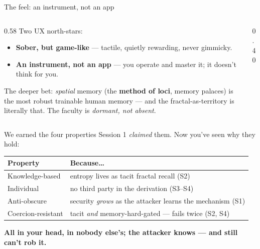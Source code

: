 \documentclass[aspectratio=169,11pt]{beamer}
\begin{document}
\begin{frame}{The feel: an instrument, not an app}
  \begin{columns}[T]
    \begin{column}{0.58\textwidth}
      Two UX north-stars:
      \begin{itemize}\small
        \item \textbf{Sober, but game-like} --- tactile, quietly rewarding, never
          gimmicky.
        \item \textbf{An instrument, not an app} --- you operate and master it; it
          doesn't think for you.
      \end{itemize}
      \vspace{4pt}
      The deeper bet: \emph{spatial} memory (the \textbf{method of loci}, memory
      palaces) is the most robust trainable human memory --- and the
      fractal-as-territory is literally that. The faculty is \emph{dormant, not
      absent}.
    \end{column}
    \begin{column}{0.40\textwidth}
    \end{column}
  \end{columns}
\end{frame}

\begin{frame}{We earned the four properties}
  Session 1 \emph{claimed} them. Now you've seen why they hold:
  \begin{center}\footnotesize
  \renewcommand{\arraystretch}{1.3}
  \begin{tabular}{@{}l l@{}}
    \toprule
    \textbf{Property} & \textbf{Because\ldots} \\
    \midrule
    Knowledge-based & entropy lives as tacit fractal recall (S2) \\
    Individual & no third party in the derivation (S3--S4) \\
    Anti-obscure & security \emph{grows} as the attacker learns the mechanism (S1) \\
    Coercion-resistant & tacit \emph{and} memory-hard-gated --- fails twice (S2, S4) \\
    \bottomrule
  \end{tabular}
  \end{center}
  \vspace{4pt}
  \begin{center}\small
  \textbf{\color{accentdark}All in your head, in nobody else's; the attacker
  knows --- and still can't rob it.}
  \end{center}
\end{frame}
\end{document}
